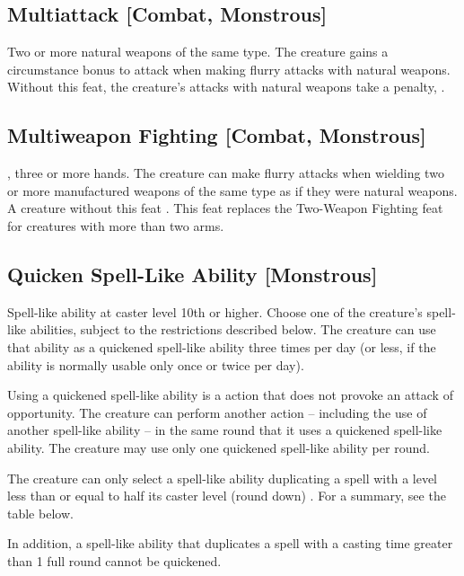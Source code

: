 {\subsection{Multiattack [Combat, Monstrous]}
 Two or more natural weapons of the same type.
 The creature gains a  circumstance bonus to attack when making flurry attacks with natural weapons.
 Without this feat, the creature's  attacks with natural weapons take a  penalty, .

\subsection{Multiweapon Fighting [Combat, Monstrous]}
 , three or more hands.
 The creature can make flurry attacks when wielding two or more manufactured weapons of the same type as if they were natural weapons.
 A creature without this feat .
 This feat replaces the Two-Weapon Fighting feat for creatures with more than two arms.

\subsection{Quicken Spell-Like Ability [Monstrous]}
 Spell-like ability at caster level 10th or higher.
 Choose one of the creature's spell-like abilities, subject to the restrictions described below. The creature can use that ability as a quickened spell-like ability three times per day (or less, if the ability is normally usable only once or twice per day).

Using a quickened spell-like ability is a  action that does not provoke an attack of opportunity. The creature can perform another action -- including the use of another spell-like ability -- in the same round that it uses a quickened spell-like ability. The creature may use only one quickened spell-like ability per round.

The creature can only select a spell-like ability duplicating a spell with a level less than or equal to half its caster level (round down) . For a summary, see the table below.

In addition, a spell-like ability that duplicates a spell with a casting time greater than 1 full round cannot be quickened.

}
